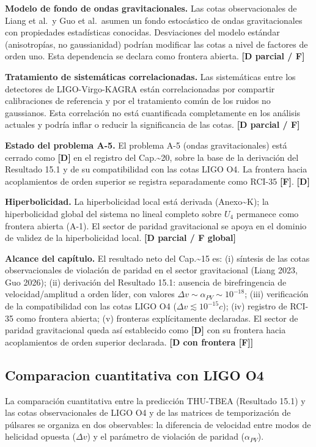 ﻿\documentclass[11pt,letterpaper]{article}
\begin{document}
\textbf{Modelo de fondo de ondas gravitacionales.} Las cotas observacionales de Liang et al.\ y Guo et al.\ asumen un fondo estocástico de ondas gravitacionales con propiedades estadísticas conocidas. Desviaciones del modelo estándar (anisotropías, no gaussianidad) podrían modificar las cotas a nivel de factores de orden uno. Esta dependencia se declara como frontera abierta. \textbf{[D parcial / F]}

\textbf{Tratamiento de sistemáticas correlacionadas.} Las sistemáticas entre los detectores de LIGO-Virgo-KAGRA están correlacionadas por compartir calibraciones de referencia y por el tratamiento común de los ruidos no gaussianos. Esta correlación no está cuantificada completamente en los análisis actuales y podría inflar o reducir la significancia de las cotas. \textbf{[D parcial / F]}

\textbf{Estado del problema A-5.} El problema A-5 (ondas gravitacionales) está cerrado como \textbf{[D]} en el registro del Cap.\textasciitilde{}20, sobre la base de la derivación del Resultado 15.1 y de su compatibilidad con las cotas LIGO O4. La frontera hacia acoplamientos de orden superior se registra separadamente como RCI-35 \textbf{[F]}. \textbf{[D]}

\textbf{Hiperbolicidad.} La hiperbolicidad local está derivada (Anexo\textasciitilde{}K); la hiperbolicidad global del sistema no lineal completo sobre $U_4$ permanece como frontera abierta (A-1). El sector de paridad gravitacional se apoya en el dominio de validez de la hiperbolicidad local. \textbf{[D parcial / F global]}

\textbf{Alcance del capítulo.} El resultado neto del Cap.\textasciitilde{}15 es: (i) síntesis de las cotas observacionales de violación de paridad en el sector gravitacional (Liang 2023, Guo 2026); (ii) derivación del Resultado 15.1: ausencia de birefringencia de velocidad/amplitud a orden líder, con valores $\Delta v \sim \alpha_{PV} \sim 10^{-18}$; (iii) verificación de la compatibilidad con las cotas LIGO O4 ($\Delta v \lesssim 10^{-15}c$); (iv) registro de RCI-35 como frontera abierta; (v) fronteras explícitamente declaradas. El sector de paridad gravitacional queda así establecido como \textbf{[D]} con su frontera hacia acoplamientos de orden superior declarada. \textbf{[D con frontera [F]]}
\subsection{Comparacion cuantitativa con LIGO O4}
La comparación cuantitativa entre la predicción THU-TBEA (Resultado 15.1) y las cotas observacionales de LIGO O4 y de las matrices de temporización de púlsares se organiza en dos observables: la diferencia de velocidad entre modos de helicidad opuesta ($\Delta v$) y el parámetro de violación de paridad ($\alpha_{PV}$).
\end{document}
